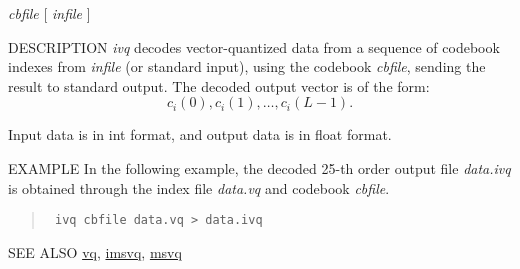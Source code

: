 \begin{synopsis}
\item [ivq] [ --l $L$ ] [ --n $N$ ] {\em cbfile}  [ {\em infile} ] 
\end{synopsis}

\begin{qsection}{DESCRIPTION}
{\em ivq} decodes vector-quantized data from a sequence of codebook indexes
from {\em infile} (or standard input), 
using the codebook {\em cbfile}, 
sending the result to standard output. 
The decoded output vector is of the form:
\begin{displaymath}
  c_i(0),c_i(1),\dots,c_i(L-1). 
\end{displaymath}

Input data is in int format, and output data is in float format.
\end{qsection}

\begin{options}
\end{options}

\begin{qsection}{EXAMPLE}
In the following example,
the decoded 25-th order output file {\em data.ivq} is obtained
through the index file {\em data.vq} and codebook {\em cbfile}.
\begin{quote}
\verb! ivq cbfile data.vq > data.ivq !
\end{quote}
\end{qsection}

\begin{qsection}{SEE ALSO}
\hyperlink{vq}{vq},
\hyperlink{imsvq}{imsvq},
\hyperlink{msvq}{msvq}
\end{qsection}
